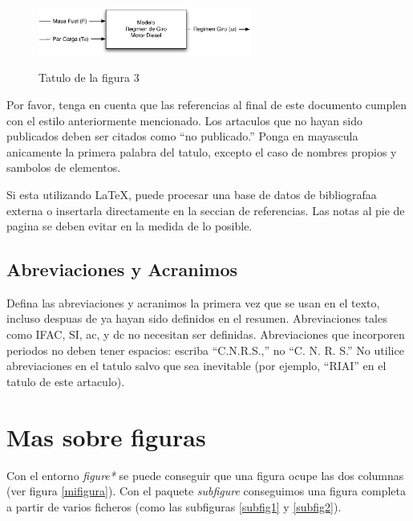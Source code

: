 \documentclass[5p,times,authoryear]{elsarticle}
\begin{document}
\begin{figure}
\centering
  \includegraphics[width=7cm]{figurapdf}\\
  \caption{Tatulo de la figura 3}\label{fig3}
\end{figure}

Por favor, tenga en cuenta que las referencias al final de este
documento cumplen con el estilo anteriormente mencionado. Los
artaculos que no hayan sido publicados deben ser citados como ``no
publicado.'' Ponga en mayascula anicamente la primera palabra del
tatulo, excepto el caso de nombres propios y sambolos de elementos.

Si esta utilizando LaTeX, puede procesar una base de datos de bibliografaa externa o insertarla directamente en la seccian de referencias.
Las notas al pie de pagina se deben evitar en la medida de lo posible.

\subsection{Abreviaciones y Acranimos}

Defina las abreviaciones y acranimos la primera vez que se usan en
el texto, incluso despuas de ya hayan sido definidos en el resumen.
Abreviaciones tales como IFAC, SI, ac, y dc no necesitan ser
definidas. Abreviaciones que incorporen periodos no deben tener
espacios: escriba ``C.N.R.S.,'' no ``C. N. R. S.'' No utilice
abreviaciones en el tatulo salvo que sea inevitable (por ejemplo,
``RIAI'' en el tatulo de este artaculo).

\section{Mas sobre figuras}

Con el entorno \emph{figure*} se puede conseguir que una figura ocupe las dos columnas (ver figura \ref{mifigura}). Con el paquete \emph{subfigure} conseguimos una figura completa a partir de varios ficheros (como las subfiguras \ref{subfig1} y \ref{subfig2}).
\end{document}
